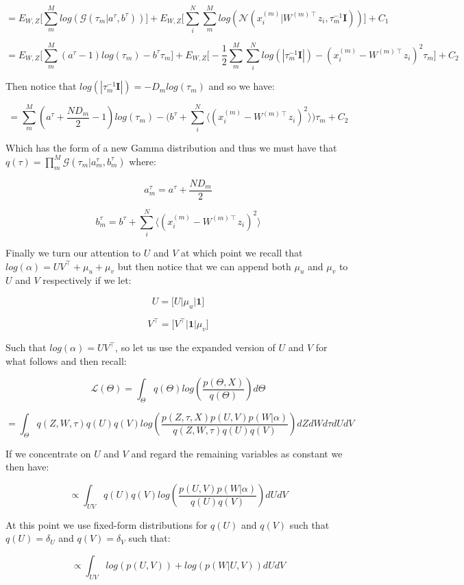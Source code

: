 \documentclass{article}
\begin{document}
$$ = E_{W,Z}\bigg[\sum_m^M{log(\mathcal{G}(\tau_m|a^\tau,b^\tau))}\bigg] +  E_{W,Z}\bigg[\sum_i^N{\sum_m^M{log(\mathcal{N}(x_i^{(m)}|W^{(m)\intercal}z_i, \tau_m^{-1}\textbf{I}))}}\bigg]+C_1$$

$$ = E_{W,Z}\bigg[\sum_m^M{(a^\tau-1)log(\tau_m) - b^\tau\tau_m}\bigg] + E_{W,Z}\bigg[-\frac{1}{2}\sum_m^M{\sum_i^N{log(|\tau_m^{-1}\textbf{I}|) - (x_i^{(m)}-W^{(m)\intercal}z_i)^2\tau_m}}\bigg]+C_2$$

Then notice that $log(|\tau_m^{-1}\textbf{I}|) =  -D_mlog(\tau_m)$ and so we have:

$$ = \sum_m^M{(a^\tau + \frac{ND_m}{2} - 1)log(\tau_m) - \bigg(b^\tau + \sum_i^N{\bigg\langle(x_i^{(m)}-W^{(m)\intercal}z_i)^2\bigg\rangle}\bigg)\tau_m}+C_2$$

Which has the form of a new Gamma distribution and thus we must have that $q(\tau) = \prod_m^M{\mathcal{G}(\tau_m|a_m^\tau,b_m^\tau)}$ where:

$$a_m^\tau = a^\tau + \frac{ND_m}{2}$$

$$b_m^\tau = b^\tau + \sum_i^N{\bigg\langle(x_i^{(m)}-W^{(m)\intercal}z_i)^2\bigg\rangle}$$

Finally we turn our attention to $U$ and $V$ at which point we recall that $log(\alpha) = UV^\intercal + \mu_u + \mu_v$ but then notice that we can append both $\mu_u$ and $\mu_v$ to $U$ and $V$ respectively if we let:

$$U = \bigg[U\bigg|\mu_u\bigg|\textbf{1}\bigg]$$

$$V^\intercal = \bigg[V^\intercal\bigg|\textbf{1}\bigg|\mu_v\bigg]$$

Such that $log(\alpha) = UV^\intercal$, so let us use the expanded version of $U$ and $V$ for what follows and then recall:

$$\mathcal{L}(\Theta) = \int_\Theta{q(\Theta)log(\frac{p(\Theta,X)}{q(\Theta)})d\Theta}$$

$$= \int_\Theta{ q(Z,W,\tau)q(U)q(V)log(\frac{p(Z,\tau,X)p(U,V)p(W|\alpha)}{q(Z,W,\tau)q(U)q(V)})dZdWd\tau dUdV}$$

If we concentrate on $U$ and $V$ and regard the remaining variables as constant we then have:

$$ \propto \int_{UV}{q(U)q(V)log(\frac{p(U,V)p(W|\alpha)}{q(U)q(V)})dUdV}$$

At this point we use fixed-form distributions for $q(U)$ and $q(V)$ such that $q(U)=\delta_U$ and $q(V) = \delta_V$ such that:

$$ \propto \int_{UV}{log(p(U,V)) + log(p(W|U,V)) dUdV}$$
\end{document}
